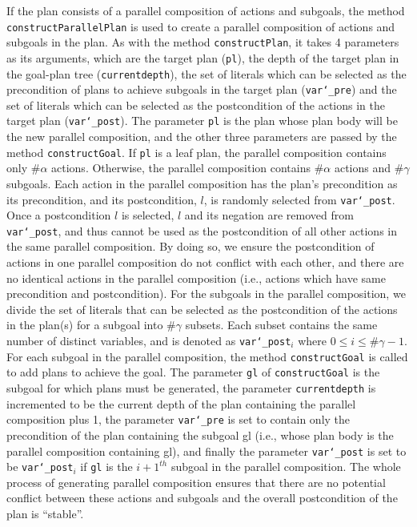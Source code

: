 \documentclass[11pt, a4paper]{article}
\begin{document}
If the plan consists of a parallel composition of actions and subgoals, the method  \texttt{constructParallelPlan} is used to create a parallel composition of actions and subgoals in the plan. As with the method \texttt{constructPlan}, it takes 4 parameters as its arguments, which are the target plan (\texttt{pl}), the depth of the target plan in the goal-plan tree (\texttt{currentdepth}), the set of literals which can be selected as the precondition of  plans to achieve subgoals in the target plan (\texttt{var\char`_pre}) and the set of literals which can be selected as the postcondition of the actions in the target plan (\texttt{var\char`_post}). 
%
The parameter \texttt{pl} is the plan whose plan body will be the new parallel composition, and the other three parameters are passed by the method \texttt{constructGoal}. If \texttt{pl} is a leaf plan, the parallel composition contains only $\#\alpha$ actions. Otherwise, the parallel composition contains $\#\alpha$ actions and $\#\gamma$ subgoals. 
%
Each action in the parallel composition has the plan's precondition as its precondition, and its postcondition, $l$, is randomly selected from \texttt{var\char`_post}. 
%
Once a postcondition $l$ is selected, $l$ and its negation are removed from \texttt{var\char`_post}, and thus cannot be used as the postcondition of all other actions in the same parallel composition. By doing so, we ensure the postcondition of actions in one parallel composition do not conflict with each other, and there are no identical actions in the parallel composition (i.e., actions which have same precondition and postcondition).
%
For the subgoals in the parallel composition, we divide the set of literals that can be selected as the postcondition of the actions in the plan(s) for a subgoal into $\#\gamma$ subsets. Each subset contains the same number of distinct variables, and is denoted as \texttt{var\char`_post$_i$} where $0 \leq i \leq \#\gamma - 1$.
%
For each subgoal in the parallel composition, the method \texttt{constructGoal} is called to add plans to achieve the goal. The parameter \texttt{gl} of \texttt{constructGoal} is the subgoal for which plans must be generated, the parameter \texttt{currentdepth} is incremented to be the current depth of the plan containing the parallel composition plus 1, the parameter \texttt{var\char`_pre} is set to contain only the precondition of the plan containing the subgoal gl (i.e., whose plan body is the parallel composition containing gl),
%
and finally the parameter \texttt{var\char`_post} is set to be \texttt{var\char`_post$_i$} if \texttt{gl} is the ${i+1}^{th}$ subgoal in the parallel composition.
%
The whole process of generating parallel composition ensures that there are no potential conflict between these actions and subgoals and the overall postcondition of the plan is ``stable''.
\end{document}
